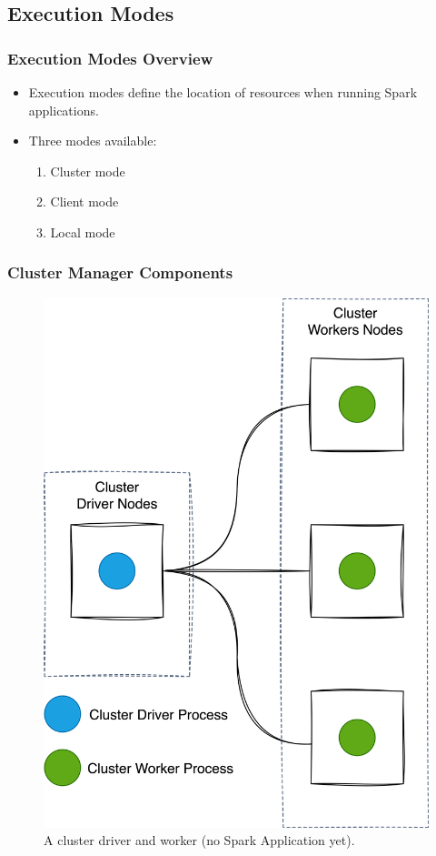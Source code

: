 
\subsection{Execution Modes}\label{subsec:deployment-mode}
\begin{frame}
    \frametitle{Execution Modes Overview}
    \begin{itemize}
        \item Execution modes define the location of resources when running Spark applications.
        \item Three modes available:
        \begin{enumerate}
            \item Cluster mode
            \item Client mode
            \item Local mode
        \end{enumerate}
    \end{itemize}
\end{frame}

\begin{frame}
    \frametitle{Cluster Manager Components}
    \begin{figure}
        \includegraphics[width=\textwidth,height=.7\textheight,keepaspectratio]{./Figures/chapter-04/cluster_manager_processes}
        \caption{A cluster driver and worker (no Spark Application yet).}\label{fig:cluster-manager-components}
    \end{figure}
\end{frame}

